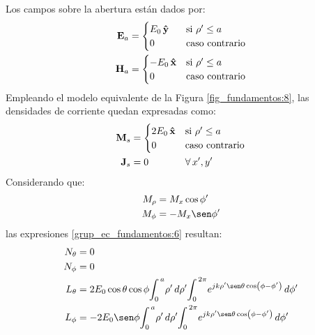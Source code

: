 Los campos sobre la abertura están dados por:
\begin{align}
\mathbf{E}_a &= 
\begin{cases}
\makebox[0pt][l]{$E_0\,\versor{y}$}\hphantom{-E_0\,\versor{x}} &\text{si } \rho' \leq a\\
0  &\text{caso contrario}
\end{cases}
\label{ec_apC:1}\\
\mathbf{H}_a &= 
\begin{cases} 
-E_0\,\versor{x} &\text{si } \rho' \leq a\\
0  & \text{caso contrario}
\end{cases}
\label{ec_apC:2}
\end{align}
Empleando el modelo equivalente de la Figura \ref{fig_fundamentos:8}, las densidades de corriente quedan expresadas como:
\begin{align}
\mathbf{M}_s &=
\begin{cases}
2E_0\,\versor{x} &\text{si } \rho' \leq a\\
0 &\text{caso contrario}
\end{cases}
\label{ec_apC:3}\\
\mathbf{J}_s &= \makebox[0pt][l]{$0$} 
\hphantom{\begin{cases} 2E_0\,\versor{x}\\0\end{cases}}\kern-\nulldelimiterspace
\forall\,x',y'
\label{ec_apC:4}
\end{align}
Considerando que:
\begin{subequations}
\label{grup_ec_apC:1}
\begin{align}
M_\rho  &= M_x\cos\phi '
\label{ec_apC:5}\\
M_\phi &= -M_x\sen\phi '
\label{ec_apC:6}
\end{align}
\end{subequations}
las expresiones \eqref{grup_ec_fundamentos:6} resultan:
\begin{subequations}
\label{grup_ec_apC:2}
\begin{align}
N_{\theta} &= 0
\label{ec_apC:7}\\
N_{\phi} &= 0
\label{ec_apC:8}\\
L_{\theta}  &= 2E_0\cos\theta\cos\phi\!\int_{0}^{\,a}\!\rho '\,d\rho '\!\int_{0}^{\,2\pi}\!e^{jk\rho '\sen\theta\cos\left(\phi - \phi '\right)}\,d\phi '
\label{ec_apC:9}\\
L_{\phi} &= -2E_0\sen\phi\!\int_{0}^{\,a}\!\rho '\,d\rho '\!\int_{0}^{\,2\pi}\!e^{jk\rho '\sen\theta\cos\left(\phi - \phi '\right)}\,d\phi '
\label{ec_apC:10}
\end{align}
\end{subequations}
